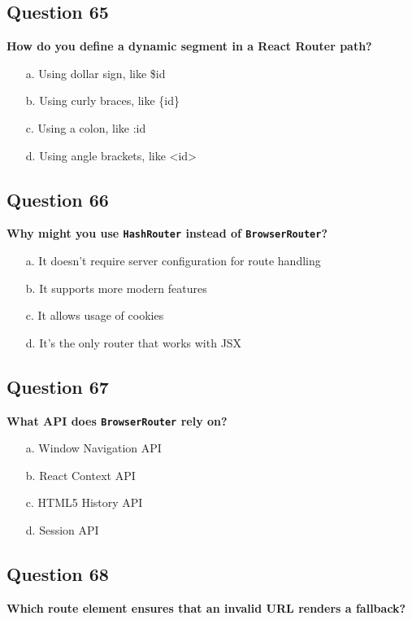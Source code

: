 \documentclass{article}
\begin{document}
\subsection*{Question 65}
\textbf{How do you define a dynamic segment in a React Router path?}

\begin{itemize}
  \item[a.] Using dollar sign, like \$id
  \item[b.] Using curly braces, like \{id\}
  \item[c.] Using a colon, like :id
  \item[d.] Using angle brackets, like <id>
\end{itemize}

\subsection*{Question 66}
\textbf{Why might you use \texttt{HashRouter} instead of \texttt{BrowserRouter}?}

\begin{itemize}
  \item[a.] It doesn’t require server configuration for route handling
  \item[b.] It supports more modern features
  \item[c.] It allows usage of cookies
  \item[d.] It’s the only router that works with JSX
\end{itemize}

\subsection*{Question 67}
\textbf{What API does \texttt{BrowserRouter} rely on?}

\begin{itemize}
  \item[a.] Window Navigation API
  \item[b.] React Context API
  \item[c.] HTML5 History API
  \item[d.] Session API
\end{itemize}

\subsection*{Question 68}
\textbf{Which route element ensures that an invalid URL renders a fallback?}
\end{document}
